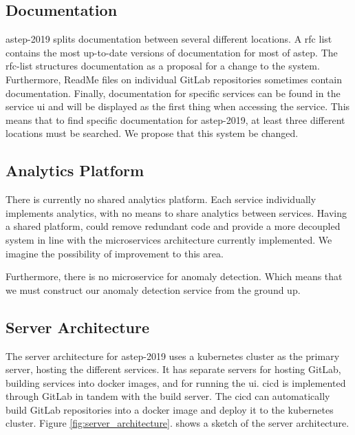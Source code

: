 \subsection{Documentation} \label{sc:documentation}
\gls{astep}-2019 splits documentation between several different locations. A \gls{rfc} list contains the most up-to-date versions of documentation for most of \gls{astep}. The \gls{rfc}-list structures documentation as a proposal for a change to the system. Furthermore, ReadMe files on individual GitLab repositories sometimes contain documentation. Finally, documentation for specific services can be found in the service \gls{ui} and will be displayed as the first thing when accessing the service. This means that to find specific documentation for \gls{astep}-2019, at least three different locations must be searched. We propose that this system be changed.

\subsection{Analytics Platform}
There is currently no shared analytics platform. Each service individually implements analytics, with no means to share analytics between services. Having a shared platform, could remove redundant code and provide a more decoupled system in line with the microservices architecture currently implemented. We imagine the possibility of improvement to this area.

Furthermore, there is no microservice for anomaly detection. Which means that we must construct our anomaly detection service from the ground up.

\subsection{Server Architecture}
The server architecture for \gls{astep}-2019 uses a \gls{kubernetes} cluster as the primary server, hosting the different services. It has separate servers for hosting GitLab, building services into \gls{docker} images, and for running the \gls{ui}. \gls{cicd} is implemented through GitLab in tandem with the build server. The \gls{cicd} can automatically build GitLab repositories into a \gls{docker} image and deploy it to the \gls{kubernetes} cluster. Figure \ref{fig:server_architecture}. shows a sketch of the server architecture. 

